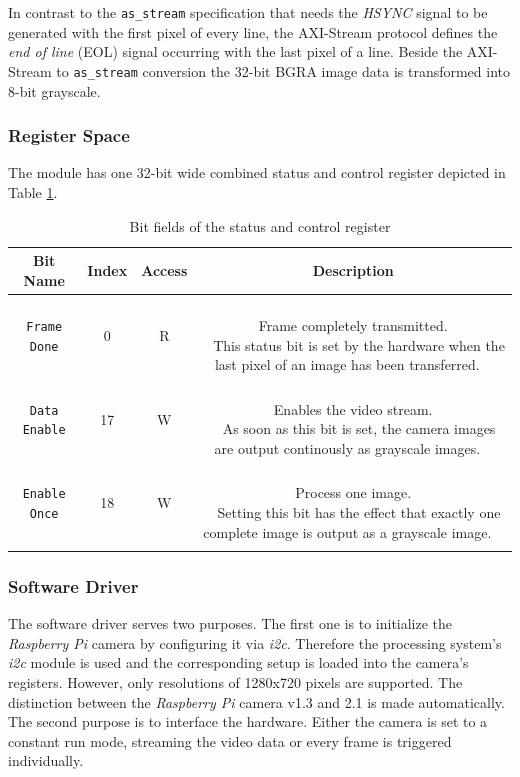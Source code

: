 In contrast to the \texttt{as\_stream} specification that needs the \textit{HSYNC} signal to be generated with the first pixel of every line, the AXI-Stream protocol defines the \textit{end of line} (EOL) signal occurring with the last pixel of a line.
Beside the AXI-Stream to \texttt{as\_stream} conversion the 32-bit BGRA image data is transformed into 8-bit grayscale.
\subsubsection{Register Space}

The module has one 32-bit wide combined status and control register depicted in Table \ref{07-as-picam-register}.

\begin{longtable}[htb]{|c|c|c|c|}
\hline
\textbf{Bit Name} & \textbf{Index} & \textbf{Access} & \textbf{Description} \\
\hline
\endhead

\texttt{Frame Done} & 0 & R &
\parbox{8,5cm}{ ~ \\ Frame completely transmitted. \\ ~  \small
This status bit is set by the hardware when the last pixel of an image has been transferred.
\vspace{0.3em} ~ } \\

\hline

\texttt{Data Enable} & 17 & W &
\parbox{8,5cm}{ ~ \\ Enables the video stream. \\ ~ \small
As soon as this bit is set, the camera images are output continously as grayscale images.
\vspace{0.3em} ~ } \\

\hline

\texttt{Enable Once} & 18 & W &
\parbox{8,5cm}{ ~ \\ Process one image. \\ ~  \small
Setting this bit has the effect that exactly one complete image is output as a grayscale image.
\vspace{0.3em} ~ } \\

\hline

\caption{Bit fields of the status and control register}
\label{07-as-picam-register}
\end{longtable}

\subsubsection{Software Driver}

The software driver serves two purposes. The first one is to initialize the \textit{Raspberry Pi} camera by configuring it via \textit{i2c}. Therefore the processing system's \textit{i2c} module is used and the corresponding setup is loaded into the camera's registers. However, only resolutions of 1280x720 pixels are supported. The distinction between the \textit{Raspberry Pi} camera v1.3 and 2.1 is made automatically.
The second purpose is to interface the hardware. Either the camera is set to a constant run mode, streaming the video data or every frame is triggered individually.
